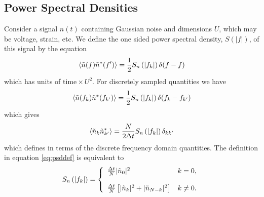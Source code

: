 \subsection*{Power Spectral Densities}
\label{ss:psdconv}

Consider a signal $n(t)$ containing Gaussian noise and dimensions $U$, which
may be voltage, strain, etc. We define the one sided power spectral density,
$S(|f|)$, of this signal by the equation
\begin{equation}
\left\langle\tilde{n}(f) \tilde{n}^\ast(f')\right\rangle = 
\frac{1}{2}S_n\left(\left|f_{k}\right|\right)\delta(f-f)
\end{equation}
which has units of $\mathrm{time}\times U^2$. For discretely sampled 
quantities we have
\begin{equation}
\left\langle\tilde{n}(f_k) \tilde{n}^\ast(f_{k'})\right\rangle = 
\frac{1}{2}S_n\left(\left|f_{k}\right|\right)\delta(f_k-f_{k'})
\end{equation}
which gives
\begin{equation}
\label{eq:psddef}
\left\langle\tilde{n}_k \tilde{n}_{k'}^\ast\right\rangle = 
\frac{N}{2\Delta t}S_n\left(\left|f_{k}\right|\right)\delta_{kk'}
\end{equation}
which defines \ospsd in terms of the discrete frequency domain quantities.
The definition in equation \ref{eq:psddef} is equivalent to
\begin{equation}
S_n\left(\left|f_{k}\right|\right) = \left\{
\begin{array}{ll}
\frac{\Delta t}{N} | \tilde{n}_0 |^2 & k = 0, \\
\\
\frac{\Delta t}{N} \left[ | \tilde{n}_k |^2 + | \tilde{n}_{N-k} |^2 \right] &
k\neq 0.
\end{array}
\right.
\end{equation}

